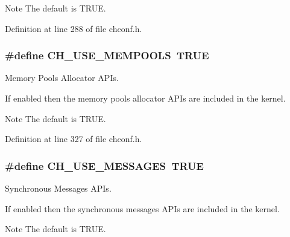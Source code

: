 \begin{DoxyNote}{Note}
The default is {\ttfamily T\+R\+U\+E}. 
\end{DoxyNote}


Definition at line 288 of file chconf.\+h.

\hypertarget{group__config_gac456517b37f104d2226fef50310c79f8}{}
\subsubsection[{C\+H\+\_\+\+U\+S\+E\+\_\+\+M\+E\+M\+P\+O\+O\+L\+S}]{\setlength{\rightskip}{0pt plus 5cm}\#define C\+H\+\_\+\+U\+S\+E\+\_\+\+M\+E\+M\+P\+O\+O\+L\+S~T\+R\+U\+E}\label{group__config_gac456517b37f104d2226fef50310c79f8}


Memory Pools Allocator A\+P\+Is. 

If enabled then the memory pools allocator A\+P\+Is are included in the kernel.

\begin{DoxyNote}{Note}
The default is {\ttfamily T\+R\+U\+E}. 
\end{DoxyNote}


Definition at line 327 of file chconf.\+h.

\hypertarget{group__config_ga3823e336736d522bbfaf780c86746482}{}
\subsubsection[{C\+H\+\_\+\+U\+S\+E\+\_\+\+M\+E\+S\+S\+A\+G\+E\+S}]{\setlength{\rightskip}{0pt plus 5cm}\#define C\+H\+\_\+\+U\+S\+E\+\_\+\+M\+E\+S\+S\+A\+G\+E\+S~T\+R\+U\+E}\label{group__config_ga3823e336736d522bbfaf780c86746482}


Synchronous Messages A\+P\+Is. 

If enabled then the synchronous messages A\+P\+Is are included in the kernel.

\begin{DoxyNote}{Note}
The default is {\ttfamily T\+R\+U\+E}. 
\end{DoxyNote}


